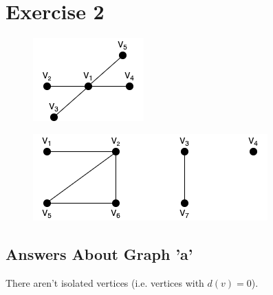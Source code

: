 \documentclass{article}
\begin{document}
\section{Exercise 2}
    \begin{figure}[H]
        \centering
        \begin{minipage}[b]{0.3\textwidth}
            \includegraphics[width=\textwidth]{3.png}
            \label{fig:figure-2-a}
        \end{minipage}
        \hfill
        \begin{minipage}[b]{0.5\textwidth}
            \includegraphics[width=\textwidth]{4.png}
            \label{fig:figure-2-b}
        \end{minipage}
        \label{fig:figure-2}
    \end{figure}
    
    \subsection{Answers About Graph 'a'}
    There aren't isolated vertices (i.e. vertices with \(d(v)=0\)).\newline
    
\end{document}
